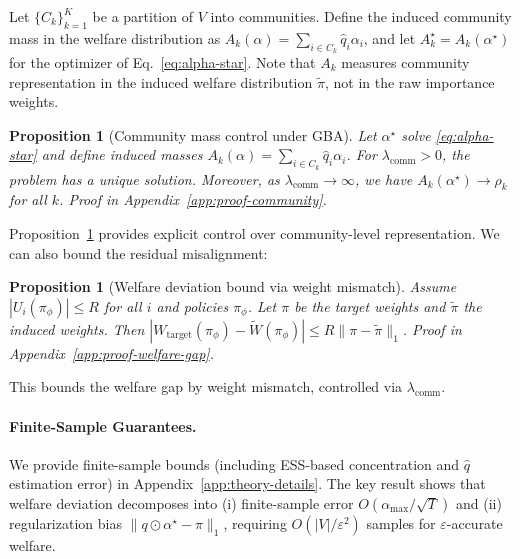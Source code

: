 \documentclass{article}
\theoremstyle{plain}
\newtheorem{proposition}[theorem]{Proposition}
\theoremstyle{definition}
\theoremstyle{remark}
\begin{document}
Let $\{C_k\}_{k=1}^K$ be a partition of $V$ into communities.
Define the induced community mass in the welfare distribution as
$A_k(\alpha) = \sum_{i \in C_k} \hat q_i \alpha_i$, and let
$A_k^\star = A_k(\alpha^\star)$ for the optimizer of
Eq.~\eqref{eq:alpha-star}. Note that $A_k$ measures community representation
in the induced welfare distribution $\tilde\pi$, not in the raw
importance weights.

\begin{proposition}[Community mass control under GBA]
\label{prop:community-balance}
Let $\alpha^\star$ solve \eqref{eq:alpha-star} and define induced masses
$A_k(\alpha) = \sum_{i \in C_k} \hat q_i \alpha_i$. For
$\lambda_{\text{comm}} > 0$, the problem has a unique solution. Moreover,
as $\lambda_{\text{comm}} \to \infty$, we have $A_k(\alpha^\star) \to \rho_k$ for all $k$. Proof in Appendix~\ref{app:proof-community}.
\end{proposition}

Proposition~\ref{prop:community-balance} provides explicit control over community-level representation. We can also bound the residual misalignment:

\begin{proposition}[Welfare deviation bound via weight mismatch]
\label{prop:welfare-gap}
Assume $|U_i(\pi_\phi)| \le R$ for all $i$ and policies $\pi_\phi$. Let
$\pi$ be the target weights and $\tilde\pi$ the induced weights.
Then $|W_{\text{target}}(\pi_\phi) - \widetilde{W}(\pi_\phi)| \le R \|\pi - \tilde\pi\|_1$. Proof in Appendix~\ref{app:proof-welfare-gap}.
\end{proposition}

This bounds the welfare gap by weight mismatch, controlled via $\lambda_{\text{comm}}$.

\paragraph{Finite-Sample Guarantees.}
We provide finite-sample bounds (including ESS-based concentration and $\hat q$ estimation error) in Appendix~\ref{app:theory-details}. The key result shows that welfare deviation decomposes into (i) finite-sample error $O(\alpha_{\max}/\sqrt{T})$ and (ii) regularization bias $\|q \odot \alpha^\star - \pi\|_1$, requiring $O(|V|/\varepsilon^2)$ samples for $\varepsilon$-accurate welfare.


\end{document}

